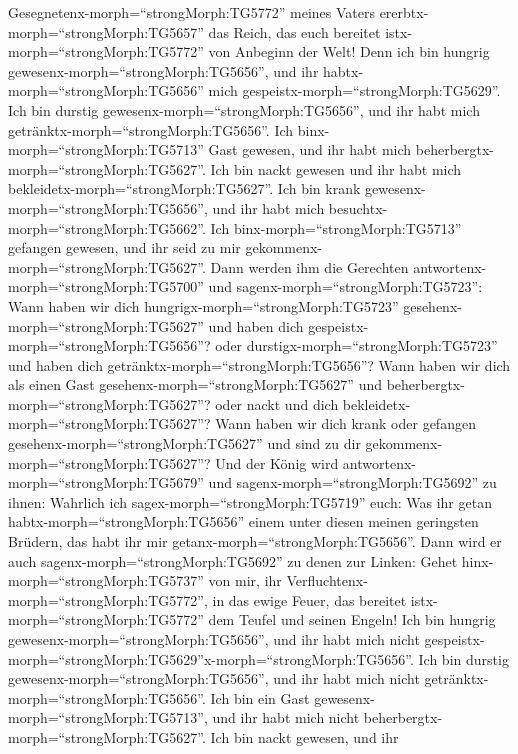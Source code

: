 Gesegnetenx-morph=``strongMorph:TG5772'' meines Vaters
ererbtx-morph=``strongMorph:TG5657'' das Reich, das euch bereitet
istx-morph=``strongMorph:TG5772'' von Anbeginn der Welt! 
Denn ich bin hungrig gewesenx-morph=``strongMorph:TG5656'', und ihr
habtx-morph=``strongMorph:TG5656'' mich
gespeistx-morph=``strongMorph:TG5629''. Ich bin durstig
gewesenx-morph=``strongMorph:TG5656'', und ihr habt mich
getränktx-morph=``strongMorph:TG5656''. Ich
binx-morph=``strongMorph:TG5713'' Gast gewesen, und ihr habt mich
beherbergtx-morph=``strongMorph:TG5627''.  Ich bin nackt
gewesen und ihr habt mich bekleidetx-morph=``strongMorph:TG5627''. Ich
bin krank gewesenx-morph=``strongMorph:TG5656'', und ihr habt mich
besuchtx-morph=``strongMorph:TG5662''. Ich
binx-morph=``strongMorph:TG5713'' gefangen gewesen, und ihr seid zu mir
gekommenx-morph=``strongMorph:TG5627''.  Dann werden ihm
die Gerechten antwortenx-morph=``strongMorph:TG5700'' und
sagenx-morph=``strongMorph:TG5723'': Wann haben wir dich
hungrigx-morph=``strongMorph:TG5723''
gesehenx-morph=``strongMorph:TG5627'' und haben dich
gespeistx-morph=``strongMorph:TG5656''? oder
durstigx-morph=``strongMorph:TG5723'' und haben dich
getränktx-morph=``strongMorph:TG5656''?  Wann haben wir
dich als einen Gast gesehenx-morph=``strongMorph:TG5627'' und
beherbergtx-morph=``strongMorph:TG5627''? oder nackt und dich
bekleidetx-morph=``strongMorph:TG5627''?  Wann haben wir
dich krank oder gefangen gesehenx-morph=``strongMorph:TG5627'' und sind
zu dir gekommenx-morph=``strongMorph:TG5627''?  Und der
König wird antwortenx-morph=``strongMorph:TG5679'' und
sagenx-morph=``strongMorph:TG5692'' zu ihnen: Wahrlich ich
sagex-morph=``strongMorph:TG5719'' euch: Was ihr getan
habtx-morph=``strongMorph:TG5656'' einem unter diesen meinen geringsten
Brüdern, das habt ihr mir getanx-morph=``strongMorph:TG5656''.
 Dann wird er auch sagenx-morph=``strongMorph:TG5692'' zu
denen zur Linken: Gehet hinx-morph=``strongMorph:TG5737'' von mir, ihr
Verfluchtenx-morph=``strongMorph:TG5772'', in das ewige Feuer, das
bereitet istx-morph=``strongMorph:TG5772'' dem Teufel und seinen Engeln!
 Ich bin hungrig gewesenx-morph=``strongMorph:TG5656'', und
ihr habt mich nicht
gespeistx-morph=``strongMorph:TG5629''x-morph=``strongMorph:TG5656''.
Ich bin durstig gewesenx-morph=``strongMorph:TG5656'', und ihr habt mich
nicht getränktx-morph=``strongMorph:TG5656''.  Ich bin ein
Gast gewesenx-morph=``strongMorph:TG5713'', und ihr habt mich nicht
beherbergtx-morph=``strongMorph:TG5627''. Ich bin nackt gewesen, und ihr

